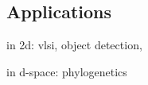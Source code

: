 \subsection{Applications}
\label{sec:applications-1}

in 2d: vlsi, object detection,

in d-space: phylogenetics

\chapterbreak{}

